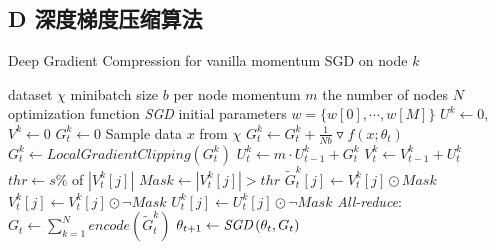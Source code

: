 \subsection{D 深度梯度压缩算法}
\begin{minipage}[t]{.50\textwidth}
  \begin{algorithm}[H] \small
    \caption{{\small Deep Gradient Compression for vanilla momentum SGD on node $k$}}
    \label{alg:smsgd}
    \begin{algorithmic}[1]
      \Require dataset $\chi$
      \Require minibatch size $b$ per node
      \Require momentum $m$
      \Require the number of nodes $N$
      \Require optimization function \emph{SGD}
      \Require initial parameters $w = \{w[0], \cdots, w[M]\}$
      \State $U^{k} \gets 0$, $V^{k} \gets 0$
      \State $G_{t}^{k} \gets 0$
      \State Sample data $x$ from $\chi$
      \State $G_{t}^{k} \gets G_{t}^{k} + \frac{1}{Nb} \triangledown f \left(x;\theta_{t} \right) $
      \EndFor
                \State $G_{t}^{k} \gets LocalGradientClipping(G_{t}^{k})$
                \EndIf
      \State $U_{t}^{k} \gets m \cdot U_{t-1}^{k} + G_{t}^{k}$
      \State $V_{t}^{k} \gets V_{t-1}^{k} + U_{t}^{k}$
      \State $thr \gets s\%$ of $\left|V_{t}^{k}[j]\right|$
      \State $ Mask \gets \left|V_{t}^{k}[j]\right| > thr$
      \State $\widetilde{G}_{t}^{k}[j] \gets V_{t}^{k}[j] \odot Mask$
      \State $V_{t}^{k}[j] \gets V_{t}^{k}[j] \odot \neg Mask$
                \State $U_{t}^{k}[j] \gets U_{t}^{k}[j] \odot \neg Mask$
      \EndFor
      \State \emph{All-reduce}: $G_{t} \gets \sum_{k=1}^{N} encode(\widetilde{G}_{t}^{k})$
      \State $\theta_{t+1} \gets \emph{SGD} \left(\theta_{t}, G_{t} \right)$
      \EndFor
    \end{algorithmic}
  \end{algorithm}
\end{minipage}

